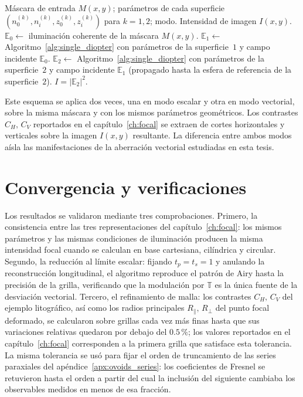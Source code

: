 \begin{algorithm}[H]
\caption{Sistema de dos superficies cartesianas conjugadas}
\label{alg:two_diopter}
\begin{algorithmic}[1]
\Require Máscara de entrada $M(x,y)$; parámetros de cada superficie
$(n_0^{(k)},n_i^{(k)},z_0^{(k)},z_i^{(k)})$ para $k=1,2$; modo.
\Ensure Intensidad de imagen $I(x,y)$.
\State $\mathbb E_0\gets$ iluminación coherente de la máscara $M(x,y)$.
\State $\mathbb E_1\gets$ Algoritmo~\ref{alg:single_diopter} con parámetros
de la superficie~$1$ y campo incidente $\mathbb E_0$.
\State $\mathbb E_2\gets$ Algoritmo~\ref{alg:single_diopter} con parámetros
de la superficie~$2$ y campo incidente $\mathbb E_1$ (propagado hasta la
esfera de referencia de la superficie~$2$).
\State \Return $I=|\mathbb E_2|^2$.
\end{algorithmic}
\end{algorithm}

Este esquema se aplica dos veces, una en modo escalar y otra en modo
vectorial, sobre la misma máscara y con los mismos parámetros geométricos.
Los contrastes $C_H,\,C_V$ reportados en el capítulo~\ref{ch:focal} se
extraen de cortes horizontales y verticales sobre la imagen $I(x,y)$
resultante. La diferencia entre ambos modos aísla las manifestaciones de la
aberración vectorial estudiadas en esta tesis.

\section{Convergencia y verificaciones}

Los resultados se validaron mediante tres comprobaciones. Primero, la
consistencia entre las tres representaciones del capítulo~\ref{ch:focal}:
los mismos parámetros y las mismas condiciones de iluminación producen la
misma intensidad focal cuando se calculan en base cartesiana, cilíndrica y
circular. Segundo, la reducción al límite escalar: fijando
$t_p=t_s=1$ y anulando la reconstrucción longitudinal, el algoritmo
reproduce el patrón de Airy hasta la precisión de la grilla, verificando
que la modulación por $\mathbb T$ es la única fuente de la desviación
vectorial. Tercero, el refinamiento de malla: los contrastes
$C_H,\,C_V$ del ejemplo litográfico, así como los radios principales
$R_\parallel,\,R_\perp$ del punto focal deformado, se calcularon sobre
grillas cada vez más finas hasta que sus variaciones relativas quedaron por
debajo del $0.5\,\%$; los valores reportados en el capítulo~\ref{ch:focal}
corresponden a la primera grilla que satisface esta tolerancia. La misma
tolerancia se usó para fijar el orden de truncamiento de las series
paraxiales del apéndice~\ref{apx:ovoids_series}: los coeficientes de
Fresnel se retuvieron hasta el orden a partir del cual la inclusión del
siguiente cambiaba los observables medidos en menos de esa fracción.

